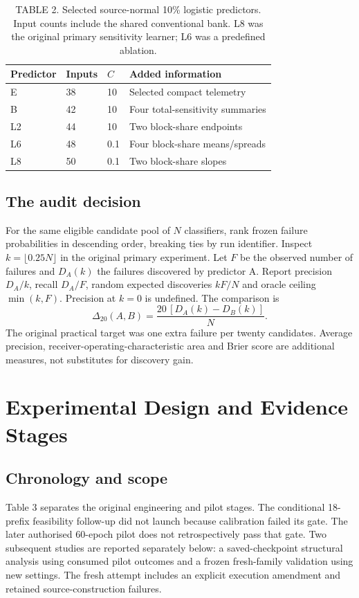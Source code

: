 \begin{table}[t]
\caption{TABLE 2. Selected source-normal 10\% logistic predictors. Input counts include the shared conventional bank. L8 was the original primary sensitivity learner; L6 was a predefined ablation.}
\label{tab:learners}
\centering\small
\begin{tabular}{llll}
\toprule Predictor & Inputs & $C$ & Added information\\\midrule
E &38&10&Selected compact telemetry\\
B &42&10&Four total-sensitivity summaries\\
L2&44&10&Two block-share endpoints\\
L6&48&0.1&Four block-share means/spreads\\
L8&50&0.1&Two block-share slopes\\\bottomrule
\end{tabular}
\end{table}

\subsection{The audit decision}
For the same eligible candidate pool of $N$ classifiers, rank frozen failure probabilities in descending order, breaking ties by run identifier. Inspect $k=\lfloor0.25N\rfloor$ in the original primary experiment. Let $F$ be the observed number of failures and $D_A(k)$ the failures discovered by predictor A. Report precision $D_A/k$, recall $D_A/F$, random expected discoveries $kF/N$ and oracle ceiling $\min(k,F)$. Precision at $k=0$ is undefined. The comparison is
\begin{equation}
\Delta_{20}(A,B)=\frac{20\,[D_A(k)-D_B(k)]}{N}.
\label{eq:gain}
\tag{7}\end{equation}
The original practical target was one extra failure per twenty candidates. Average precision, receiver-operating-characteristic area and Brier score are additional measures, not substitutes for discovery gain.

\section{Experimental Design and Evidence Stages}
\label{sec:experiments}
\subsection{Chronology and scope}
Table 3 separates the original engineering and pilot stages. The conditional 18-prefix feasibility follow-up did not launch because calibration failed its gate. The later authorised 60-epoch pilot does not retrospectively pass that gate. Two subsequent studies are reported separately below: a saved-checkpoint structural analysis using consumed pilot outcomes and a frozen fresh-family validation using new settings. The fresh attempt includes an explicit execution amendment and retained source-construction failures.

